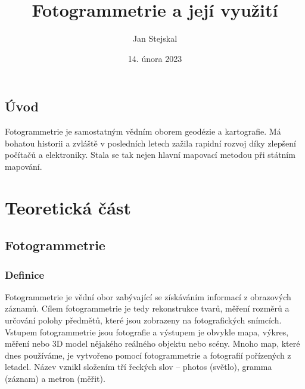 \documentclass[12pt]{report}			%
\author{Jan Stejskal}
\title{Fotogrammetrie a její využití}
\date{14. února 2023}
\begin{document}
	\mytitlepage						%
	
	
	
	
	\tableofcontents\newpage			%
	
	
	
	
	\chapter*{Úvod}
	   Fotogrammetrie je samostatným vědním oborem geodézie a kartografie. Má bohatou historii a zvláště v posledních letech zažila rapidní rozvoj díky zlepšení počítačů a elektroniky. Stala se tak nejen hlavní mapovací metodou při státním mapování.
	
	
	\part{Teoretická část}
	
		\chapter{Fotogrammetrie}
			
			\section{Definice}
				Fotogrammetrie je vědní obor zabývající se získáváním informací z obrazových záznamů. Cílem fotogrammetrie je tedy rekonstrukce tvarů, měření rozměrů a určování polohy předmětů, které jsou zobrazeny na fotografických snímcích. Vstupem fotogrammetrie jsou fotografie a výstupem je obvykle mapa, výkres, měření nebo 3D model nějakého reálného objektu nebo scény. Mnoho map, které dnes používáme, je vytvořeno pomocí fotogrammetrie a fotografií pořízených z letadel. Název vznikl složením tří řeckých slov -- photos (světlo), gramma (záznam) a metron (měřit).
                
\end{document}
